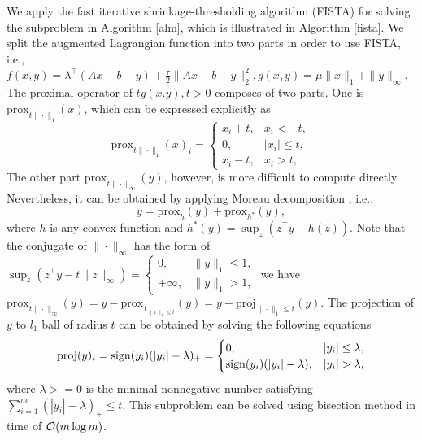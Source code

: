 \documentclass{article}
\newcommand{\prox}{\mathrm{prox}}
\newcommand{\proj}{\mathrm{proj}}
\begin{document}
 We apply the fast iterative shrinkage-thresholding algorithm (FISTA) \cite{beck2009fast} for solving the subproblem in Algorithm \ref{alm}, which is illustrated in Algorithm \ref{fista}. We split the augmented Lagrangian function into two parts in order to use FISTA, i.e., $f(x,y) = \lambda^\top(Ax-b-y)+\frac{\tau}{2}\|Ax-b-y\|_2^2,g(x,y)=\mu\|x\|_1+\|y\|_\infty$. The proximal operator of $tg(x.y),t>0$ composes of two parts. One is $\prox_{t\|\cdot\|_1}(x)$, which can be expressed explicitly as
 \begin{equation}
\prox_{t\|\cdot\|_1}(x)_i = \begin{cases}
x_i+t,&x_i <-t, \\
0, & |x_i|\le t,\\
x_i-t, & x_i > t,
\end{cases}
 \end{equation}
The other part $\prox_{t\|\cdot\|_\infty}(y)$, however, is more difficult to compute directly. Nevertheless, it can be obtained by applying Moreau decomposition \cite{hiriart1989moreau}, i.e., 
\begin{equation}\label{moreau}
	y = \prox_h(y)+\prox_{h^*}(y),
\end{equation}
where $h$ is any convex function and $h^*(y)=\sup_z(z^\top y-h(z))$. Note that the conjugate of $\|\cdot\|_\infty$ has the form of $\sup_z(z^\top y-t\|z\|_\infty) = \begin{cases}
0, &\|y\|_1\le 1,\\ 
+\infty, & \|y\|_1>1,
\end{cases}$ we have $\prox_{t\|\cdot\|_\infty}(y) = y-\prox_{1_{\|x\|_1\le t}}(y)= y-\proj_{\|\cdot\|_1\le t}(y)$. The projection of $y$ to $l_1$ ball of radius $t$ can be obtained by solving the following equations
\begin{equation}\label{proj}
\proj(y)_i = \sign(y_i)(|y_i|-\lambda)_+=\begin{cases}
 0, & |y_i| \le \lambda,\\
 \sign(y_i)(|y_i|-\lambda), &|y_i|>\lambda,
\end{cases}
\end{equation}
where $\lambda>=0 $ is the minimal nonnegative number satisfying $\sum_{i=1}^m (|y_i|-\lambda)_+ \le t$. This subproblem can be solved using bisection method in time of $\mathcal O (m\log m)$. 
\end{document}
